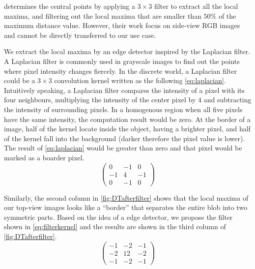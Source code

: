 \citeauthor{sharma2012blob} \cite{sharma2012blob} determines the central points by applying a $3\times3$ filter to extract all the local maxima, and filtering out the local maxima that are smaller than $50\%$ of the maximum distance value. However, their work focus on side-view RGB images and cannot be directly transferred to our use case.

We extract the local maxima by an edge detector inspired by the Laplacian filter. A Laplacian filter is commonly used in grayscale images to find out the points where pixel intensity changes fiercely. In the discrete world, a Laplacian filter could be a $3\times3$ convolution kernel written as the following \autoref{eq:laplacian}. Intuitively speaking, a Laplacian filter compares the intensity of a pixel with its four neighbours, multiplying the intensity of the center pixel by 4 and subtracting the intensity of surrounding pixels. In a homogenous region when all five pixels have the same intensity, the computation result would be zero. At the border of a image, half of the kernel locate inside the object, having a brighter pixel, and half of the kernel fall into the background (darker therefore the pixel value is lower). The result of \autoref{eq:laplacian} would be greater than zero and that pixel would be marked as a boarder pixel.
\begin{equation}\label{eq:laplacian}
  \begin{pmatrix}
    0 & -1 & 0 \\
    -1 & 4 & -1 \\
    0 & -1 & 0
  \end{pmatrix}
\end{equation}

Similarly, the second column in \autoref{fig:DTafterfilter} shows that the local maxima of our top-view images looks like a ``border'' that separates the entire blob into two symmetric parts. Based on the idea of a edge detector, we propose the filter shown in \autoref{eq:filterkernel} and the results are shown in the third column of \autoref{fig:DTafterfilter}.
\begin{equation}\label{eq:filterkernel}
  \begin{pmatrix}
    -1 & -2 & -1 \\
    -2 & 12 & -2 \\
    -1 & -2 & -1
  \end{pmatrix}
\end{equation}

